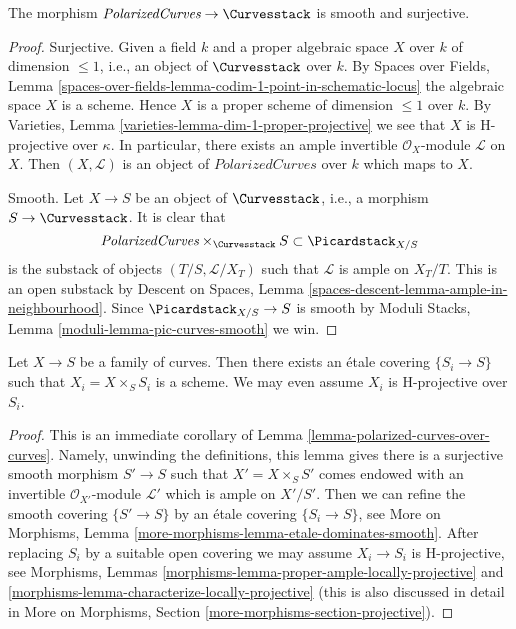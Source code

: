 \begin{lemma}
\label{lemma-polarized-curves-over-curves}
The morphism
$\textit{PolarizedCurves} \to \Curvesstack$
is smooth and surjective.
\end{lemma}

\begin{proof}
Surjective. Given a field $k$ and a proper algebraic space
$X$ over $k$ of dimension $\leq 1$, i.e., an object of $\Curvesstack$ over $k$.
By Spaces over Fields, Lemma
\ref{spaces-over-fields-lemma-codim-1-point-in-schematic-locus}
the algebraic space $X$ is a scheme. Hence $X$
is a proper scheme of dimension $\leq 1$ over $k$.
By Varieties, Lemma \ref{varieties-lemma-dim-1-proper-projective}
we see that $X$ is H-projective over $\kappa$.
In particular, there exists an ample invertible $\mathcal{O}_X$-module
$\mathcal{L}$ on $X$. Then $(X, \mathcal{L})$ is an object
of $\textit{PolarizedCurves}$ over
$k$ which maps to $X$.

\medskip\noindent
Smooth. Let $X \to S$ be an object of $\Curvesstack$, i.e., a
morphism $S \to \Curvesstack$. It is clear that
$$
\textit{PolarizedCurves}
\times_{\Curvesstack} S
\subset \Picardstack_{X/S}
$$
is the substack of objects $(T/S, \mathcal{L}/X_T)$ such that
$\mathcal{L}$ is ample on $X_T/T$. This is an open substack by
Descent on Spaces, Lemma \ref{spaces-descent-lemma-ample-in-neighbourhood}.
Since $\Picardstack_{X/S} \to S$ is smooth by
Moduli Stacks, Lemma \ref{moduli-lemma-pic-curves-smooth}
we win.
\end{proof}

\begin{lemma}
\label{lemma-etale-locally-scheme}
Let $X \to S$ be a family of curves.
Then there exists an \'etale covering $\{S_i \to S\}$
such that $X_i = X \times_S S_i$ is a scheme. We may even
assume $X_i$ is H-projective over $S_i$.
\end{lemma}

\begin{proof}
This is an immediate corollary of
Lemma \ref{lemma-polarized-curves-over-curves}.
Namely, unwinding the definitions, this lemma gives there is a
surjective smooth morphism $S' \to S$ such that $X' = X \times_S S'$
comes endowed with an invertible $\mathcal{O}_{X'}$-module
$\mathcal{L}'$ which is ample on $X'/S'$.
Then we can refine the smooth covering $\{S' \to S\}$
by an \'etale covering $\{S_i \to S\}$, see
More on Morphisms, Lemma \ref{more-morphisms-lemma-etale-dominates-smooth}.
After replacing $S_i$ by a suitable open covering we may assume
$X_i \to S_i$ is H-projective, see
Morphisms, Lemmas \ref{morphisms-lemma-proper-ample-locally-projective} and
\ref{morphisms-lemma-characterize-locally-projective}
(this is also discussed in detail in
More on Morphisms, Section \ref{more-morphisms-section-projective}).
\end{proof}






